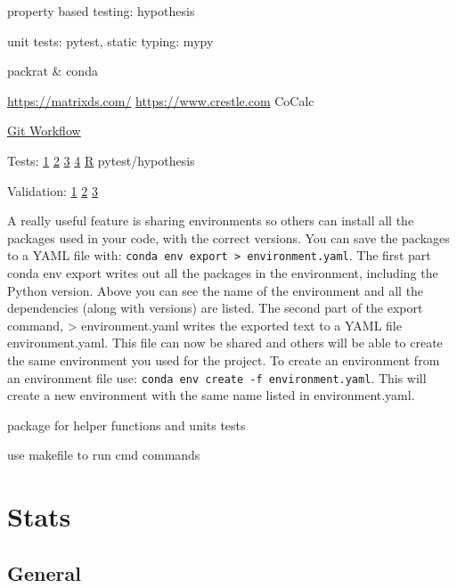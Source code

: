 \documentclass[]{book}
\begin{document}
property based testing: hypothesis

unit tests: pytest, static typing: mypy

packrat \& conda

\url{https://matrixds.com/} \textbar{} \url{https://www.crestle.com} \textbar{} CoCalc

\href{https://blog.osteele.com/2008/05/my-git-workflow/}{Git Workflow}

Tests: \href{http://engineering.pivotal.io/post/test-driven-development-for-data-science/}{1} \textbar{} \href{http://www.tdda.info/}{2} \textbar{} \href{http://stochasticsolutions.com/}{3} \textbar{} \href{https://github.com/ericmjl/data-testing-tutorial}{4} \textbar{} \href{http://r-pkgs.had.co.nz/tests.html}{R} \textbar{} pytest/hypothesis

Validation: \href{https://github.com/data-cleaning/validate}{1} \textbar{} \href{https://rdrr.io/cran/checkmate/}{2} \textbar{} \href{https://github.com/shawnbrown/datatest}{3}

A really useful feature is sharing environments so others can install all the packages used in your code, with the correct versions. You can save the packages to a YAML file with: \texttt{conda\ env\ export\ \textgreater{}\ environment.yaml}.
The first part conda env export writes out all the packages in the environment, including the Python version. Above you can see the name of the environment and all the dependencies (along with versions) are listed. The second part of the export command, \textgreater{} environment.yaml writes the exported text to a YAML file environment.yaml. This file can now be shared and others will be able to create the same environment you used for the project. To create an environment from an environment file use: \texttt{conda\ env\ create\ -f\ environment.yaml}. This will create a new environment with the same name listed in environment.yaml.

package for helper functions and units tests

use makefile to run cmd commands

\hypertarget{stats}{%
\chapter{Stats}\label{stats}}

\hypertarget{general-5}{%
\section{General}\label{general-5}}
\end{document}
